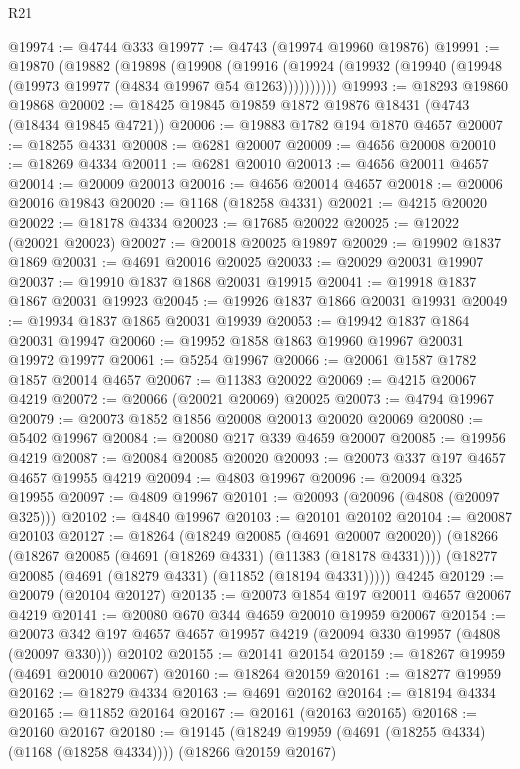 \begin{lexlean}{R21}
\begin{coremodule}
@19974 := @4744 @333
@19977 := @4743 (@19974 @19960 @19876)
@19991 := @19870
    (@19882
      (@19898
        (@19908
          (@19916 (@19924 (@19932 (@19940 (@19948 (@19973 @19977 (@4834 @19967 @54 @1263))))))))))
@19993 := @18293 @19860 @19868
@20002 := @18425 @19845 @19859 @1872 @19876 @18431 (@4743 (@18434 @19845 @4721))
@20006 := @19883 @1782 @194 @1870 @4657
@20007 := @18255 @4331
@20008 := @6281 @20007
@20009 := @4656 @20008
@20010 := @18269 @4334
@20011 := @6281 @20010
@20013 := @4656 @20011 @4657
@20014 := @20009 @20013
@20016 := @4656 @20014 @4657
@20018 := @20006 @20016 @19843
@20020 := @1168 (@18258 @4331)
@20021 := @4215 @20020
@20022 := @18178 @4334
@20023 := @17685 @20022
@20025 := @12022 (@20021 @20023)
@20027 := @20018 @20025 @19897
@20029 := @19902 @1837 @1869
@20031 := @4691 @20016 @20025
@20033 := @20029 @20031 @19907
@20037 := @19910 @1837 @1868 @20031 @19915
@20041 := @19918 @1837 @1867 @20031 @19923
@20045 := @19926 @1837 @1866 @20031 @19931
@20049 := @19934 @1837 @1865 @20031 @19939
@20053 := @19942 @1837 @1864 @20031 @19947
@20060 := @19952 @1858 @1863 @19960 @19967 @20031 @19972 @19977
@20061 := @5254 @19967
@20066 := @20061 @1587 @1782 @1857 @20014 @4657
@20067 := @11383 @20022
@20069 := @4215 @20067 @4219
@20072 := @20066 (@20021 @20069) @20025
@20073 := @4794 @19967
@20079 := @20073 @1852 @1856 @20008 @20013 @20020 @20069
@20080 := @5402 @19967
@20084 := @20080 @217 @339 @4659 @20007
@20085 := @19956 @4219
@20087 := @20084 @20085 @20020
@20093 := @20073 @337 @197 @4657 @4657 @19955 @4219
@20094 := @4803 @19967
@20096 := @20094 @325 @19955
@20097 := @4809 @19967
@20101 := @20093 (@20096 (@4808 (@20097 @325)))
@20102 := @4840 @19967
@20103 := @20101 @20102
@20104 := @20087 @20103
@20127 := @18264
    (@18249 @20085 (@4691 @20007 @20020))
    (@18266
      (@18267 @20085 (@4691 (@18269 @4331) (@11383 (@18178 @4331))))
      (@18277 @20085 (@4691 (@18279 @4331) (@11852 (@18194 @4331)))))
    @4245
@20129 := @20079 (@20104 @20127)
@20135 := @20073 @1854 @197 @20011 @4657 @20067 @4219
@20141 := @20080 @670 @344 @4659 @20010 @19959 @20067
@20154 := @20073
    @342
    @197
    @4657
    @4657
    @19957
    @4219
    (@20094 @330 @19957 (@4808 (@20097 @330)))
    @20102
@20155 := @20141 @20154
@20159 := @18267 @19959 (@4691 @20010 @20067)
@20160 := @18264 @20159
@20161 := @18277 @19959
@20162 := @18279 @4334
@20163 := @4691 @20162
@20164 := @18194 @4334
@20165 := @11852 @20164
@20167 := @20161 (@20163 @20165)
@20168 := @20160 @20167
@20180 := @19145
    (@18249 @19959 (@4691 (@18255 @4334) (@1168 (@18258 @4334))))
    (@18266 @20159 @20167)

\end{coremodule}
\end{lexlean}
